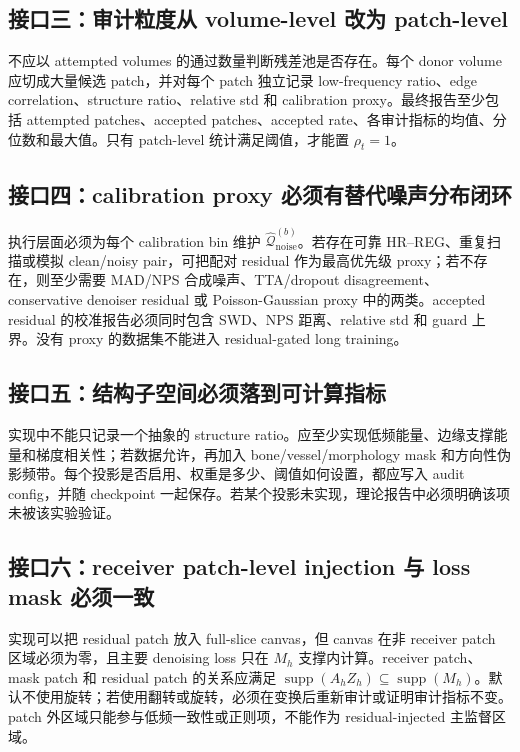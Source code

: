 \documentclass[11pt,a4paper,UTF8,fontset=fandol]{ctexart}
\theoremstyle{definition}
\DeclareMathOperator{\supp}{supp}
\begin{document}
\subsection{接口三：审计粒度从 volume-level 改为 patch-level}

不应以 attempted volumes 的通过数量判断残差池是否存在。每个 donor volume 应切成大量候选 patch，并对每个 patch 独立记录 low-frequency ratio、edge correlation、structure ratio、relative std 和 calibration proxy。最终报告至少包括 attempted patches、accepted patches、accepted rate、各审计指标的均值、分位数和最大值。只有 patch-level 统计满足阈值，才能置 $\rho_t=1$。


\subsection{接口四：calibration proxy 必须有替代噪声分布闭环}

执行层面必须为每个 calibration bin 维护 $\widehat{\mathcal Q}_{\mathrm{noise}}^{(b)}$。若存在可靠 HR--REG、重复扫描或模拟 clean/noisy pair，可把配对 residual 作为最高优先级 proxy；若不存在，则至少需要 MAD/NPS 合成噪声、TTA/dropout disagreement、conservative denoiser residual 或 Poisson-Gaussian proxy 中的两类。accepted residual 的校准报告必须同时包含 SWD、NPS 距离、relative std 和 guard 上界。没有 proxy 的数据集不能进入 residual-gated long training。

\subsection{接口五：结构子空间必须落到可计算指标}

实现中不能只记录一个抽象的 structure ratio。应至少实现低频能量、边缘支撑能量和梯度相关性；若数据允许，再加入 bone/vessel/morphology mask 和方向性伪影频带。每个投影是否启用、权重是多少、阈值如何设置，都应写入 audit config，并随 checkpoint 一起保存。若某个投影未实现，理论报告中必须明确该项未被该实验验证。

\subsection{接口六：receiver patch-level injection 与 loss mask 必须一致}

实现可以把 residual patch 放入 full-slice canvas，但 canvas 在非 receiver patch 区域必须为零，且主要 denoising loss 只在 $M_h$ 支撑内计算。receiver patch、mask patch 和 residual patch 的关系应满足 $\supp(A_hZ_h)\subseteq\supp(M_h)$。默认不使用旋转；若使用翻转或旋转，必须在变换后重新审计或证明审计指标不变。patch 外区域只能参与低频一致性或正则项，不能作为 residual-injected 主监督区域。
\end{document}
